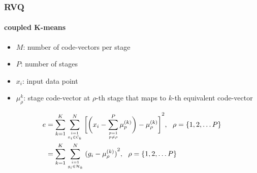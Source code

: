 \begin{frame}[plain]
\frametitle{RVQ}
\framesubtitle{coupled K-means}
\logoCSIPCPL\mypagenum
	\begin{itemize}
	\item $M$: number of code-vectors per stage
	\item $P$: number of stages
	\item $x_i$: input data point
	\item $\mu_\rho^k$: stage code-vector at $\rho$-th stage that maps to $k$-th equivalent code-vector
	\end{itemize}
	\begin{changemargin}{-1.3in}{0in}
	\begin{align}
	\label{Eq:RVQmeans}
	e&= \KmeansSum{\bigg[\RVQmultipleKmeansonealternate\bigg]}^2, \ \ \rho=\{1, 2, \ldots P\}\notag\\
	&={\RVQerroralternate}, \ \ \rho=\{1, 2, \ldots P\}
	\end{align}
	\end{changemargin}
\end{frame}

